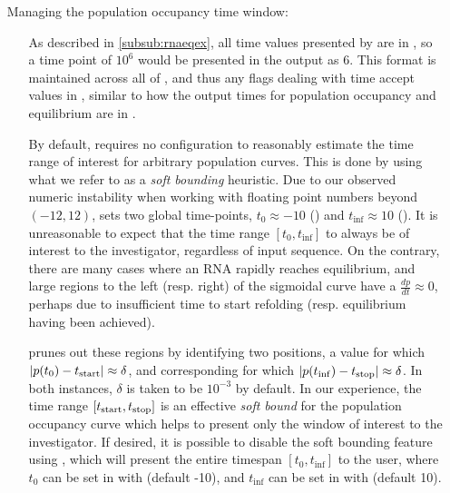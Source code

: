 \documentclass[11pt]{article}
\begin{document}
\begin{itemize}
\begin{itemize}
    \end{itemize}
  \item[Managing the population occupancy time window:] \hfill
    \begin{itemize}
      \item[] As described in \ref{subsub:rnaeqex}, all time values presented by \rnaeq are in \logtime, so a time point of $10^6$ would be presented in the output as 6. This format is maintained across all of \rnaeq, and thus any flags dealing with time accept values in \logtime, similar to how the output times for population occupancy and equilibrium are in \logtime.
      \item[] By default, \rnaeq requires no configuration to reasonably estimate the time range of interest for arbitrary population curves. This is done by using what we refer to as a {\em soft bounding} heuristic. Due to our observed numeric instability when working with floating point numbers beyond \logtime $(-12, 12)$, \rnaeq sets two global time-points, $t_{0} \approx -10$ () and $t_{\inf} \approx 10$ (). It is unreasonable to expect that the time range $[t_{0}, t_{\inf}]$ to always be of interest to the investigator, regardless of input sequence. On the contrary, there are many cases where an RNA rapidly reaches equilibrium, and large regions to the left (resp. right) of the sigmoidal curve have a $\frac{dp}{dt} \approx 0$, perhaps due to insufficient time to start refolding (resp. equilibrium having been achieved).
      \item[] \rnaeq prunes out these regions by identifying two positions, a \tStart value for which $\lvert p(t_{0}) - t_{\text{start}}\rvert \approx \delta$, and corresponding \tStop for which $\lvert p(t_{\inf}) - t_{\text{stop}}\rvert \approx \delta$. In both instances, $\delta$ is taken to be $10^{-3}$ by default. In our experience, the time range $[t_{\text{start}}, t_{\text{stop}}]$ is an effective {\em soft bound} for the population occupancy curve which helps to present only the window of interest to the investigator. If desired, it is possible to disable the soft bounding feature using , which will present the entire timespan $[t_{0}, t_{\inf}]$ to the user, where $t_{0}$ can be set in \logtime with  (default -10), and $t_{\inf}$ can be set in \logtime with  (default 10).

\end{itemize}
\end{itemize}
\end{document}
